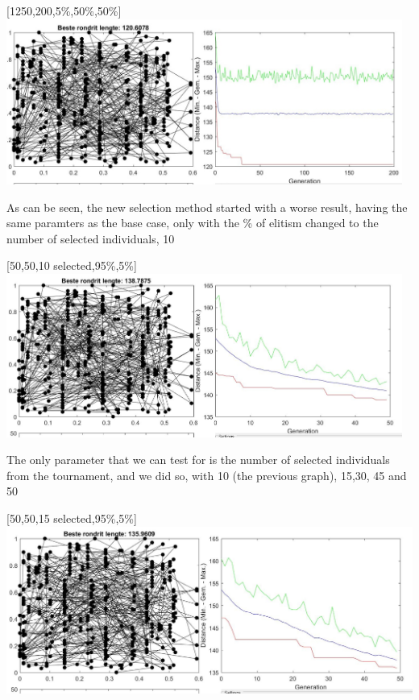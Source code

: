 \begin{center}
[1250,200,5\%,50\%,50\%]\\
\includegraphics[width=13cm]{img/specific/order_crossover/general_8.jpg}
\end{center}

As can be seen, the new selection method started with a worse result, having
the same paramters as the base case, only with the \% of elitism
changed to the number of selected individuals, 10

\begin{center}
[50,50,10 selected,95\%,5\%]\\
\includegraphics[width=13cm]{img/optional/optional_1.jpg}
\end{center}

The only parameter that we can test for is the number of selected
individuals from the tournament, and we did so, with 10 (the previous graph),
15,30, 45 and 50\\

\begin{center}
[50,50,15 selected,95\%,5\%]\\
\includegraphics[width=15cm]{img/optional/optional_2.jpg}
\end{center}


